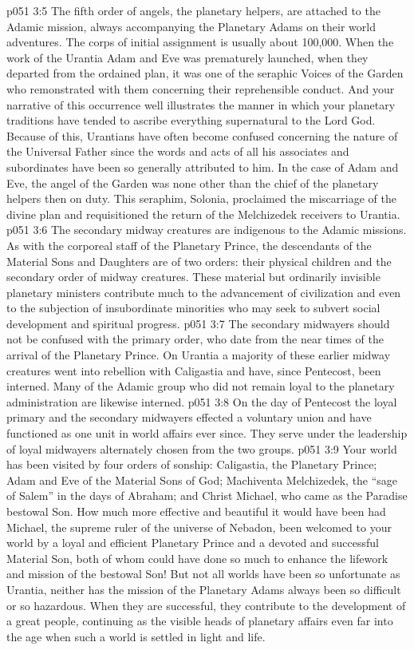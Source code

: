 \vs p051 3:5 \pc The fifth order of angels, the planetary helpers, are attached to the Adamic mission, always accompanying the Planetary Adams on their world adventures. The corps of initial assignment is usually about 100,000. When the work of the Urantia Adam and Eve was prematurely launched, when they departed from the ordained plan, it was one of the seraphic Voices of the Garden who remonstrated with them concerning their reprehensible conduct. And your narrative of this occurrence well illustrates the manner in which your planetary traditions have tended to ascribe everything supernatural to the Lord God. Because of this, Urantians have often become confused concerning the nature of the Universal Father since the words and acts of all his associates and subordinates have been so generally attributed to him. In the case of Adam and Eve, the angel of the Garden was none other than the chief of the planetary helpers then on duty. This seraphim, Solonia, proclaimed the miscarriage of the divine plan and requisitioned the return of the Melchizedek receivers to Urantia.
\vs p051 3:6 \pc The secondary midway creatures are indigenous to the Adamic missions. As with the corporeal staff of the Planetary Prince, the descendants of the Material Sons and Daughters are of two orders: their physical children and the secondary order of midway creatures. These material but ordinarily invisible planetary ministers contribute much to the advancement of civilization and even to the subjection of insubordinate minorities who may seek to subvert social development and spiritual progress.
\vs p051 3:7 The secondary midwayers should not be confused with the primary order, who date from the near times of the arrival of the Planetary Prince. On Urantia a majority of these earlier midway creatures went into rebellion with Caligastia and have, since Pentecost, been interned. Many of the Adamic group who did not remain loyal to the planetary administration are likewise interned.
\vs p051 3:8 On the day of Pentecost the loyal primary and the secondary midwayers effected a voluntary union and have functioned as one unit in world affairs ever since. They serve under the leadership of loyal midwayers alternately chosen from the two groups.
\vs p051 3:9 \pc Your world has been visited by four orders of sonship: Caligastia, the Planetary Prince; Adam and Eve of the Material Sons of God; Machiventa Melchizedek, the “sage of Salem” in the days of Abraham; and Christ Michael, who came as the Paradise bestowal Son. How much more effective and beautiful it would have been had Michael, the supreme ruler of the universe of Nebadon, been welcomed to your world by a loyal and efficient Planetary Prince and a devoted and successful Material Son, both of whom could have done so much to enhance the lifework and mission of the bestowal Son! But not all worlds have been so unfortunate as Urantia, neither has the mission of the Planetary Adams always been so difficult or so hazardous. When they are successful, they contribute to the development of a great people, continuing as the visible heads of planetary affairs even far into the age when such a world is settled in light and life.
